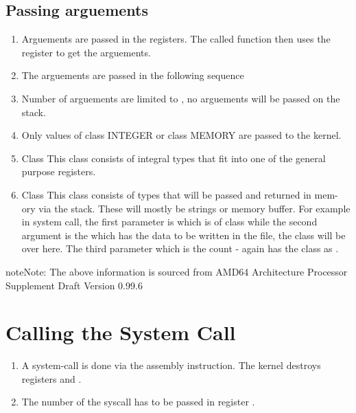 \documentclass[letterpaper,10pt,english]{sphinxmanual}
\begin{document}
\subsection{Passing arguements}
\label{\detokenize{05_calling_system_calls:passing-arguements}}\begin{enumerate}
\item {} 
Arguements are passed in the registers. The called function then uses the register to get the arguements.

\item {} 
The arguements are passed in the following sequence 

\item {} 
Number of arguements are limited to , no arguements will be passed on the stack.

\item {} 
Only values of class INTEGER or class MEMORY are passed to the kernel.

\item {} 
Class  This class consists of integral types that fit into one of the general
purpose registers.

\item {} 
Class  This class consists of types that will be passed and returned in mem-
ory via the stack. These will mostly be strings or memory buffer. For example in  system call, the first parameter is  which is of class  while the second argument is the  which has the data to be written in the file, the class will be  over here. The third parameter which is the count - again has the class as .

\end{enumerate}

\begin{sphinxadmonition}{note}{Note:}
The above information is sourced from AMD64 Architecture Processor Supplement Draft Version 0.99.6
\end{sphinxadmonition}


\section{Calling the System Call}
\label{\detokenize{05_calling_system_calls:calling-the-system-call}}\begin{enumerate}
\item {} 
A system-call is done via the  assembly instruction. The kernel destroys registers  and .

\item {} 
The number of the syscall has to be passed in register .

\end{enumerate}
\end{document}
